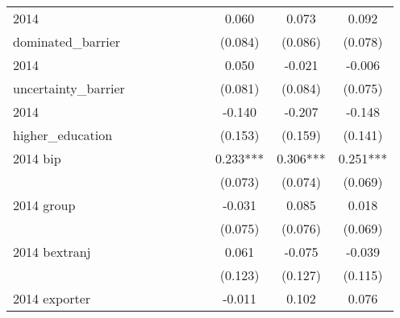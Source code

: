 \begin{table}[htbp]
\begin{tabular}{l*{9}{c}}
2014                &               &               &               &               &               &               &       0.060   &       0.073   &       0.092   \\
dominated\_barrier   &               &               &               &               &               &               &     (0.084)   &     (0.086)   &     (0.078)   \\
2014                &               &               &               &               &               &               &       0.050   &      -0.021   &      -0.006   \\
uncertainty\_barrier &               &               &               &               &               &               &     (0.081)   &     (0.084)   &     (0.075)   \\
2014                &               &               &               &               &               &               &      -0.140   &      -0.207   &      -0.148   \\
higher\_education    &               &               &               &               &               &               &     (0.153)   &     (0.159)   &     (0.141)   \\
2014 bip            &               &               &               &               &               &               &       0.233***&       0.306***&       0.251***\\
                    &               &               &               &               &               &               &     (0.073)   &     (0.074)   &     (0.069)   \\
2014 group          &               &               &               &               &               &               &      -0.031   &       0.085   &       0.018   \\
                    &               &               &               &               &               &               &     (0.075)   &     (0.076)   &     (0.069)   \\
2014 bextranj       &               &               &               &               &               &               &       0.061   &      -0.075   &      -0.039   \\
                    &               &               &               &               &               &               &     (0.123)   &     (0.127)   &     (0.115)   \\
2014 exporter       &               &               &               &               &               &               &      -0.011   &       0.102   &       0.076   \\

\end{tabular}
\end{table}
